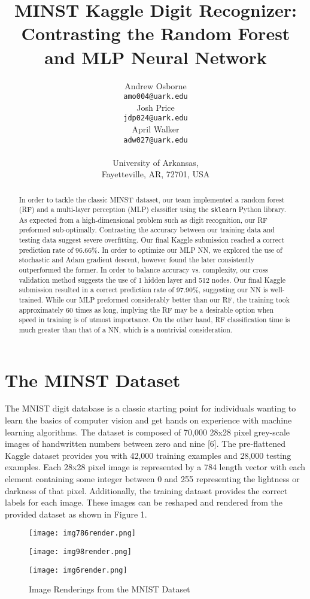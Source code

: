 \documentclass{article}
\title{MINST Kaggle Digit Recognizer: Contrasting the Random Forest and MLP Neural Network}
\author{%
   Andrew Osborne \\
   \texttt{amo004@uark.edu} \\
   \And
   Josh Price \\
   \texttt{jdp024@uark.edu} \\
   \AND
   April Walker \\
   \texttt{adw027@uark.edu} \\
   \\
   University of Arkansas, \\
   Fayetteville, AR, 72701, USA
}
\begin{document}

\maketitle

\begin{abstract}
  In order to tackle the classic MINST dataset, our team implemented a random forest (RF) and a multi-layer perception (MLP) classifier using the \verb+sklearn+ Python library. As expected from a high-dimensional problem such as digit recognition, our RF preformed sub-optimally. Contrasting the accuracy between our training data and testing data suggest severe overfitting. Our final Kaggle submission reached a correct prediction rate of 96.66\%. In order to optimize our MLP NN, we explored the use of stochastic and Adam gradient descent, however found the later consistently outperformed the former. In order to balance accuracy vs. complexity, our cross validation method suggests the use of 1 hidden layer and 512 nodes. Our final Kaggle submission resulted in a correct prediction rate of 97.90\%, suggesting our NN is well-trained. While our MLP preformed considerably better than our RF, the training took approximately 60 times as long, implying the RF may be a desirable option when speed in training is of utmost importance. On the other hand, RF classification time is much greater than that of a NN, which is a nontrivial consideration.
\end{abstract}

\section{The MINST Dataset}
The MNIST digit database is a classic starting point for individuals wanting to learn the basics of computer vision and get hands on experience with machine learning algorithms. The dataset is composed of 70,000 28x28 pixel grey-scale images of handwritten numbers between zero and nine [6]. The pre-flattened Kaggle dataset provides you with 42,000 training examples and 28,000 testing examples. Each 28x28 pixel image is represented by a 784 length vector with each element containing some integer between 0 and 255 representing the lightness or darkness of that pixel. Additionally, the training dataset provides the correct labels for each image. These images can be reshaped and rendered from the provided dataset as shown in Figure 1. 
\begin{figure}[h]
  \centering
    \begin{minipage}[t]{0.3\textwidth}
        \texttt{[image: img786render.png]}
    \end{minipage}
    \begin{minipage}[t]{0.3\textwidth}
        \texttt{[image: img98render.png]}
    \end{minipage}
    \begin{minipage}[t]{0.3\textwidth}
        \texttt{[image: img6render.png]}
    \end{minipage}
  \caption{Image Renderings from the MNIST Dataset}
\end{figure}
\end{document}
